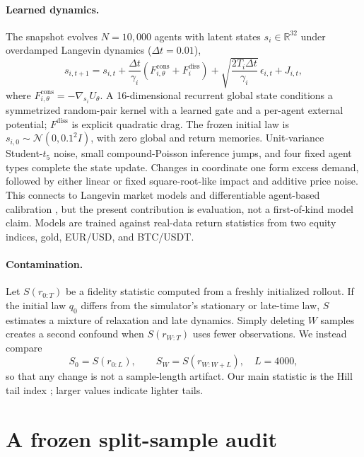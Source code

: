 \documentclass{article}
\begin{document}
\paragraph{Learned dynamics.}
The snapshot evolves $N=10{,}000$ agents with latent states $s_i\in\mathbb{R}^{32}$ under overdamped
Langevin dynamics ($\Delta t=0.01$),
\begin{equation}
  s_{i,t+1}=s_{i,t}+\frac{\Delta t}{\gamma_i}
  \left(F^{\mathrm{cons}}_{i,\theta}+F^{\mathrm{diss}}_i\right)
  +\sqrt{\frac{2T_i\Delta t}{\gamma_i}}\,\epsilon_{i,t}+J_{i,t},
\end{equation}
where $F^{\mathrm{cons}}_{i,\theta}=-\nabla_{s_i}U_{\theta}$. A 16-dimensional recurrent global state
conditions a symmetrized random-pair kernel with a learned gate and a per-agent external potential;
$F^{\mathrm{diss}}$ is explicit quadratic drag. The frozen initial law is
$s_{i,0}\sim\mathcal{N}(0,0.1^2I)$, with zero global and return memories. Unit-variance
Student-$t_5$ noise, small compound-Poisson inference jumps, and four fixed agent types complete the
state update. Changes in coordinate one form excess demand, followed by either linear or fixed
square-root-like impact and additive price noise. This connects to Langevin market models
\citep{bouchaud1998} and differentiable agent-based calibration \citep{chopra2023,dyer2023}, but the
present contribution is evaluation, not a first-of-kind model claim. Models are trained against
real-data return statistics from two equity indices, gold, EUR/USD, and BTC/USDT.

\paragraph{Contamination.}
Let $S(r_{0:T})$ be a fidelity statistic computed from a freshly initialized rollout. If the initial
law $q_0$ differs from the simulator's stationary or late-time law, $S$ estimates a mixture of
relaxation and late dynamics. Simply deleting $W$ samples creates a second confound when
$S(r_{W:T})$ uses fewer observations. We instead compare
\begin{equation}
 S_0=S(r_{0:L}),\qquad S_W=S(r_{W:W+L}),\quad L=4000,
 \label{eq:fixedlength}
\end{equation}
so that any change is not a sample-length artifact. Our main statistic is the Hill tail index
\citep{hill1975}; larger values indicate lighter tails.

\section{A frozen split-sample audit}
\end{document}

